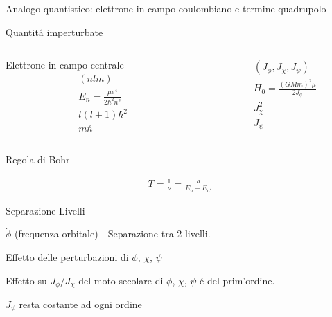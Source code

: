 \begin{frame}{Analogo quantistico: elettrone in campo coulombiano e termine quadrupolo}

\begin{block}{Quantit\'a imperturbate}

\begin{columns}

\begin{column}{0.5\textwidth}
Elettrone in campo centrale
\begin{align*}
&(nlm)\\
&E_n=\frac{\mu e^4}{2\hbar^2n^2}\\
&l(l+1)\hbar^2\\
&m\hbar
\end{align*}

\end{column}

\begin{column}{0.5\textwidth}

\begin{align*}
&(J_{\phi},J_{\chi},J_{\psi})\\
&H_0=\frac{(GMm)^2\mu}{2J_{\phi}}\\
&J_{\chi}^2\\
&J_{\psi}
\end{align*}

\end{column}

\end{columns}


\end{block}

\begin{block}{Regola di Bohr}

\begin{align*}
T=\frac{1}{\nu}=\frac{h}{E_n-E_{n'}}
\end{align*}
\end{block}

\begin{block}{Separazione Livelli}

$\dot{\phi}$ (frequenza orbitale) - Separazione tra 2 livelli.

\end{block}

\end{frame}

\begin{wordonframe}{Effetto delle perturbazioni di $\phi$, $\chi$, $\psi$}

Effetto su $J_{\phi}/J_{\chi}$ del moto secolare di $\phi$, $\chi$, $\psi$ \'e del prim'ordine.

$J_{\psi}$ resta costante ad ogni ordine

\end{wordonframe}